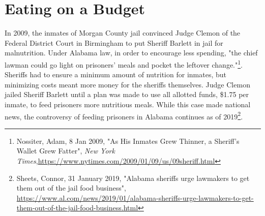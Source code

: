 \begin{comment}
Since acres are in thousands, divide the constraints of timber and animal grazing by 1000 in the problem setup, and compensate for this after obtaining a solution.

The problem can be written as follows:
\begin{align*}
\text{maximize } &\sum\limits_{i=1}^7 \sum\limits_{j=1}^3 p_{i,j}x_{i,j} \\
\text{subject to } &\sum\limits_{j=1}^3 x_{i,j} = s_i  \text{ for } i=1,..,7 \\
	        &\sum\limits_{i=1}^7 \sum\limits_{j=1}^3 t_{i,j}x_{i,j} \geq 40,000 \\
		&\sum\limits_{i=1}^7 \sum\limits_{j=1}^3 g_{i,j}x_{i,j} \geq 5 \\
		&\frac{1}{788} \sum\limits_{i=1}^7 \sum\limits_{j=1}^3 w_{i,j}x_{i,j} \geq 70 \\
		&x_{i,j} \geq 0 \text{ for } i=1,...,7  \text{ and } j=1,2,3
\end{align*}

\begin{problem}
Solve the allocation problem above.
Return the minimizing allocation vector of $x_{i,j}$'s and the maximum total net present value.
Remember to consider the following:
\begin{enumerate}
\item The allocation vector should be a (21,1) NumPy array.
\item Recall that the constraints of timber and animal grazing were divided by 1000.
To compensate, the maximum total net value will be equal to the primal objective of the appropriately minimized linear function multiplied by -1000.
\end{enumerate}
\end{problem}

\end{comment}

\section*{Eating on a Budget}

In 2009, the inmates of Morgan County jail convinced Judge Clemon of the Federal District Court in Birmingham to put Sheriff Barlett in jail for malnutrition.
Under Alabama law, in order to encourage less spending, "the chief lawman could go light on prisoners' meals and pocket the leftover change."\footnote[1]{Nossiter, Adam, 8 Jan 2009, "As His Inmates Grew Thinner, a Sheriff’s Wallet Grew Fatter", \emph{New York Times},\url{https://www.nytimes.com/2009/01/09/us/09sheriff.html}}.
Sheriffs had to ensure a minimum amount of nutrition for inmates, but minimizing costs meant more money for the sheriffs themselves.
Judge Clemon jailed Sheriff Barlett until a plan was made to use all allotted funds, \$1.75 per inmate, to feed prisoners more nutritious meals.
While this case made national news, the controversy of feeding prisoners in Alabama continues as of 2019\footnote[2]{Sheets, Connor, 31 January 2019, "Alabama sheriffs urge lawmakers to get them out of the jail food business", \url{https://www.al.com/news/2019/01/alabama-sheriffs-urge-lawmakers-to-get-them-out-of-the-jail-food-business.html}}.

